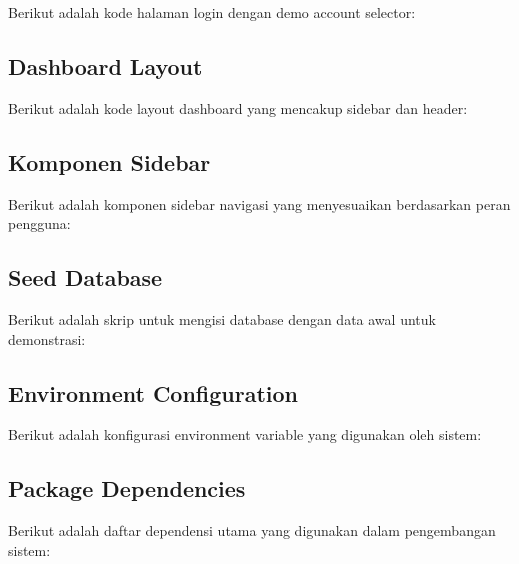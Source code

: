 \documentclass[12pt,a4paper,oneside]{report}
\begin{document}
Berikut adalah kode halaman login dengan demo account selector:



\subsection{Dashboard Layout}

Berikut adalah kode layout dashboard yang mencakup sidebar dan header:



\subsection{Komponen Sidebar}

Berikut adalah komponen sidebar navigasi yang menyesuaikan berdasarkan peran pengguna:



\subsection{Seed Database}

Berikut adalah skrip untuk mengisi database dengan data awal untuk demonstrasi:



\subsection{Environment Configuration}

Berikut adalah konfigurasi environment variable yang digunakan oleh sistem:



\subsection{Package Dependencies}

Berikut adalah daftar dependensi utama yang digunakan dalam pengembangan sistem:
\end{document}

